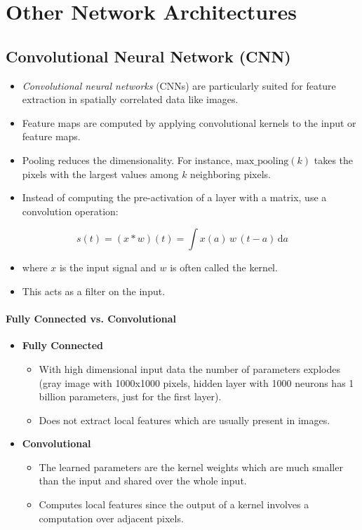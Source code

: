 \documentclass[a4paper, 11pt, accentcolor = tud3b]{tudreport}
\newcommand{\dif}[1]{\ensuremath{\,\mathrm{d}#1}}
\begin{document}
		\section{Other Network Architectures}

			\subsection{Convolutional Neural Network (CNN)}
				\begin{itemize}
					\item \emph{Convolutional neural networks} (CNNs) are particularly suited for feature extraction in spatially correlated data like images.
					\item Feature maps are computed by applying convolutional kernels to the input or feature maps.
					\item Pooling reduces the dimensionality. For instance, \( \textrm{max\_pooling}(k) \) takes the pixels with the largest values among \(k\) neighboring pixels.
					\item Instead of computing the pre-activation of a layer with a matrix, use a convolution operation:
				\end{itemize}
				\begin{equation}
					s(t) = (x \ast w)(t) = \int x(a) \, w \, (t - a) \dif{a}
				\end{equation}
				\begin{itemize}
					\item[] where \(x\) is the input signal and \(w\) is often called the kernel.
					\item This acts as a filter on the input.
				\end{itemize}
			
				\paragraph{Fully Connected vs. Convolutional}
					\begin{itemize}
						\item \textbf{Fully Connected}
							\begin{itemize}
								\item With high dimensional input data the number of parameters explodes (gray image with 1000x1000 pixels, hidden layer with 1000 neurons has 1 billion parameters, just for the first layer).
								\item Does not extract local features which are usually present in images.
							\end{itemize}
						\item \textbf{Convolutional}
							\begin{itemize}
								\item The learned parameters are the kernel weights which are much smaller than the input and shared over the whole input.
								\item Computes local features since the output of a kernel involves a computation over adjacent pixels.
							\end{itemize}
					\end{itemize}
\end{document}
